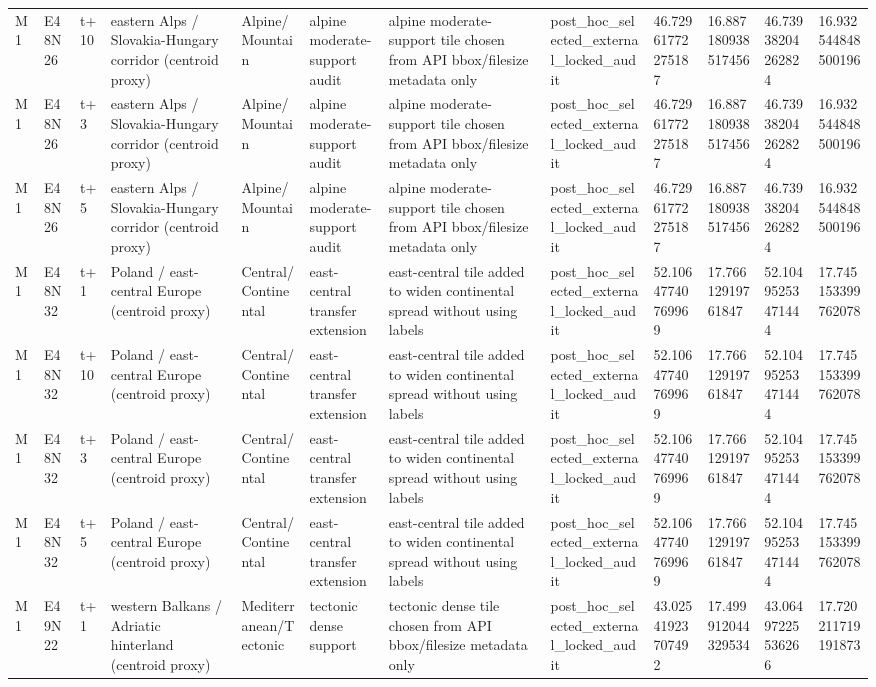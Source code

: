\begin{landscape}
\begin{longtable}{llllllllllll}
M1 & E48N26 & t+10 & eastern Alps / Slovakia-Hungary corridor (centroid proxy) & Alpine/Mountain & alpine moderate-support audit & alpine moderate-support tile chosen from API bbox/filesize metadata only & post\_hoc\_selected\_external\_locked\_audit & 46.72961772275187 & 16.887180938517456 & 46.73938204262824 & 16.932544848500196 \\
M1 & E48N26 & t+3 & eastern Alps / Slovakia-Hungary corridor (centroid proxy) & Alpine/Mountain & alpine moderate-support audit & alpine moderate-support tile chosen from API bbox/filesize metadata only & post\_hoc\_selected\_external\_locked\_audit & 46.72961772275187 & 16.887180938517456 & 46.73938204262824 & 16.932544848500196 \\
M1 & E48N26 & t+5 & eastern Alps / Slovakia-Hungary corridor (centroid proxy) & Alpine/Mountain & alpine moderate-support audit & alpine moderate-support tile chosen from API bbox/filesize metadata only & post\_hoc\_selected\_external\_locked\_audit & 46.72961772275187 & 16.887180938517456 & 46.73938204262824 & 16.932544848500196 \\
M1 & E48N32 & t+1 & Poland / east-central Europe (centroid proxy) & Central/Continental & east-central transfer extension & east-central tile added to widen continental spread without using labels & post\_hoc\_selected\_external\_locked\_audit & 52.10647740769969 & 17.76612919761847 & 52.10495253471444 & 17.745153399762078 \\
M1 & E48N32 & t+10 & Poland / east-central Europe (centroid proxy) & Central/Continental & east-central transfer extension & east-central tile added to widen continental spread without using labels & post\_hoc\_selected\_external\_locked\_audit & 52.10647740769969 & 17.76612919761847 & 52.10495253471444 & 17.745153399762078 \\
M1 & E48N32 & t+3 & Poland / east-central Europe (centroid proxy) & Central/Continental & east-central transfer extension & east-central tile added to widen continental spread without using labels & post\_hoc\_selected\_external\_locked\_audit & 52.10647740769969 & 17.76612919761847 & 52.10495253471444 & 17.745153399762078 \\
M1 & E48N32 & t+5 & Poland / east-central Europe (centroid proxy) & Central/Continental & east-central transfer extension & east-central tile added to widen continental spread without using labels & post\_hoc\_selected\_external\_locked\_audit & 52.10647740769969 & 17.76612919761847 & 52.10495253471444 & 17.745153399762078 \\
M1 & E49N22 & t+1 & western Balkans / Adriatic hinterland (centroid proxy) & Mediterranean/Tectonic & tectonic dense support & tectonic dense tile chosen from API bbox/filesize metadata only & post\_hoc\_selected\_external\_locked\_audit & 43.02541923707492 & 17.499912044329534 & 43.06497225536266 & 17.720211719191873 \\

\end{longtable}
\end{landscape}
